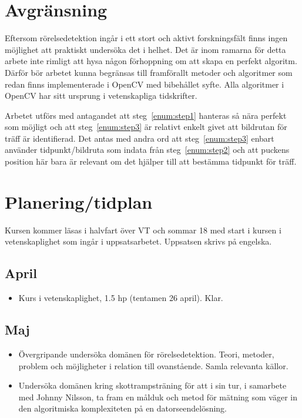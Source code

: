\documentclass[a4paper,12pt]{article}
\begin{document}
\section*{Avgränsning}
Eftersom rörelsedetektion ingår i ett stort och aktivt forskningsfält finns
ingen möjlighet att praktiskt undersöka det i helhet. Det är inom ramarna
för detta arbete inte rimligt att hysa någon förhoppning om att skapa en
perfekt algoritm. Därför bör arbetet kunna begränsas till framförallt metoder
och algoritmer som redan finns implementerade i OpenCV med bibehållet syfte.
Alla algoritmer i OpenCV har sitt ursprung i vetenskapliga tidskrifter.

Arbetet utförs med antagandet att steg~\ref{enum:step1} hanteras så nära
perfekt som möjligt och att steg~\ref{enum:step3} är relativt enkelt givet
att bildrutan för träff är identifierad. Det antas med andra ord att
steg~\ref{enum:step3} enbart använder tidpunkt/bildruta som indata från
steg~\ref{enum:step2} och att puckens position här bara är relevant om det
hjälper till att bestämma tidpunkt för träff.


\pagebreak
\section*{Planering/tidplan}
Kursen kommer läsas i halvfart över VT och sommar 18 med start i
kursen i vetenskaplighet som ingår i uppsatsarbetet. Uppsatsen skrivs på
engelska.

\subsection*{April}
\begin{itemize}
  \item Kurs i vetenskaplighet, 1.5 hp (tentamen 26 april). Klar.
\end{itemize}

\subsection*{Maj}
\begin{itemize}
  \item Övergripande undersöka domänen för rörelsedetektion. Teori, metoder,
    problem och möjligheter i relation till ovanstående. Samla relevanta
    källor.
  \item Undersöka domänen kring skottrampsträning för att i sin tur, i
    samarbete med Johnny Nilsson, ta fram en målduk och metod för mätning
    som väger in den algoritmiska komplexiteten på en datorseendelösning.
\end{itemize}
\end{document}

